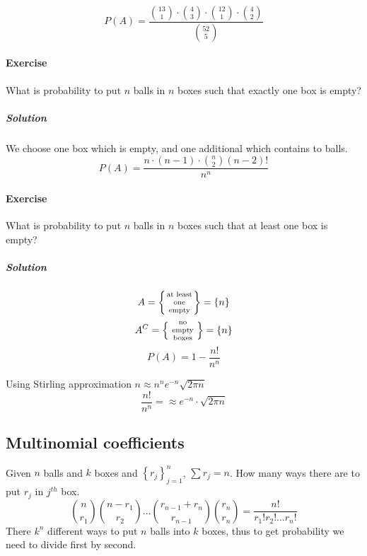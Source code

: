 $$P(A) = \frac{\binom{13}{1}  \cdot \binom{4}{3} \cdot \binom{12}{1} \cdot \binom{4}{2} }{\binom{52}{5}}$$


\paragraph{Exercise} What is probability to put $n$ balls in $n$ boxes such that exactly one box is empty?
\subparagraph{Solution}
We choose one box which is empty, and one additional which contains to balls.
$$P(A) = \frac{ n \cdot (n-1) \cdot \binom{n}{2} (n-2)! }{n^n}$$
\paragraph{Exercise} What is probability to put $n$ balls in $n$ boxes such that at least one box is empty?
\subparagraph{Solution}
$$A = \left\{ \parbox{1cm}{\centering \scriptsize at least one empty } \right\} = \left\{ n \right\}$$
$$A^C  = \left\{ \parbox{1cm}{\centering \scriptsize no empty boxes} \right\} = \left\{ n \right\}$$
$$P(A) = 1 - \frac{n! }{n^n}$$

Using Stirling approximation $n \approx n^n e^{-n} \sqrt{2\pi n}$
$$\frac{n!}{n^n} =\approx e^{-n} \cdot \sqrt{2\pi n}$$

\subsection{Multinomial coefficients}
Given $n$ balls and $k$ boxes and $\left\{ r_j \right\}_{j=1}^n$, $\sum r_j = n$. How many ways there are to put $r_j$ in $j^{th}$ box.
$$\binom{n}{r_1}\binom{n-r_1}{r_2} \dots \binom{r_{n-1}+r_n}{r_{n-1}}\binom{r_n}{r_n} = \frac{n!}{r_1!r_2!\dots r_n!}$$
There $k^n$ different ways to put $n$ balls into $k$ boxes, thus to get probability we need to divide first by second.

